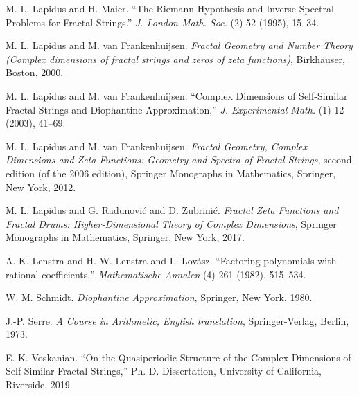 \documentclass{if-beamer}
\begin{document}
\begin{frame}[allowframebreaks]
\begin{thebibliography}{1}
M. L. Lapidus and H. Maier.
``The Riemann Hypothesis and Inverse Spectral Problems for Fractal Strings.'' \textit{J. London Math. Soc.}
(2)
52
(1995),
15--34.

M. L. Lapidus and M. van Frankenhuijsen.
\textit{Fractal Geometry and Number Theory \textup(Complex dimensions of fractal strings and zeros of zeta functions\textup)},
Birkh\"auser, Boston, 2000.

M. L. Lapidus and M. van Frankenhuijsen.
``Complex Dimensions of Self-Similar Fractal Strings and Diophantine Approximation,''  
\textit{J. Experimental Math.}
(1)
12
(2003),
41--69. 

M. L. Lapidus and M. van Frankenhuijsen.
\textit{Fractal Geometry, Complex Dimensions and Zeta Functions: Geometry and Spectra of Fractal Strings}, second edition (of the 2006 edition),
Springer Monographs in Mathematics, Springer, New York, 2012.

M. L. Lapidus and G. Radunovi\'c and D. {\u Z}ubrini\'c.
\textit{Fractal Zeta Functions and Fractal Drums: Higher-Dimensional Theory of Complex Dimensions},
Springer Monographs in Mathematics, Springer, New York, 2017.

A. K. Lenstra and H. W. Lenstra and L. Lov\'asz.
``Factoring polynomials with rational coefficients,''  
\textit{Mathematische Annalen}
(4)
261
(1982),
515--534. 

W. M. Schmidt.
\textit{Diophantine Approximation},
Springer, New York, 1980.

J.-P. Serre.
\textit{A Course in Arithmetic\textup{, English translation}},
Springer-Verlag, Berlin, 1973.

E. K. Voskanian.
``On the Quasiperiodic Structure of the Complex Dimensions of Self-Similar Fractal Strings,''
Ph. D. Dissertation, University of California, Riverside, 2019.

\end{thebibliography}

\end{frame}
\end{document}
